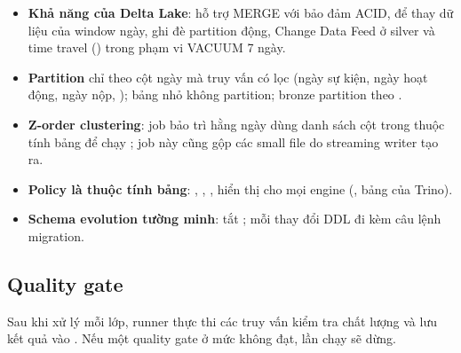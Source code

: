 \begin{itemize}
  \item \textbf{Khả năng của Delta Lake}: hỗ trợ MERGE với bảo đảm ACID,  để thay dữ liệu của window ngày, ghi đè partition động, Change Data Feed ở silver và time travel () trong phạm vi VACUUM 7 ngày.
  \item \textbf{Partition} chỉ theo cột ngày mà truy vấn có lọc (ngày sự kiện, ngày hoạt động, ngày nộp, ); bảng nhỏ không partition; bronze partition theo .
  \item \textbf{Z-order clustering}: job bảo trì hằng ngày dùng danh sách cột trong thuộc tính bảng  để chạy ; job này cũng gộp các small file do streaming writer tạo ra.
  \item \textbf{Policy là thuộc tính bảng}: , , ,  hiển thị cho mọi engine (, bảng  của Trino).
  \item \textbf{Schema evolution tường minh}: tắt ; mỗi thay đổi DDL đi kèm câu lệnh migration.
\end{itemize}

\subsection{Quality gate}

Sau khi xử lý mỗi lớp, runner thực thi các truy vấn kiểm tra chất lượng và lưu kết quả vào . Nếu một quality gate ở mức  không đạt, lần chạy sẽ dừng.

